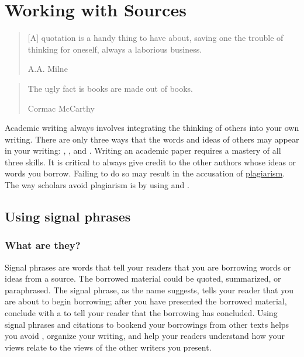 
\hypertarget{sources}{}


\chapter{Working with Sources}

\begin{quote} \small [A] quotation is a handy thing to have about, saving one the trouble of thinking for oneself, always a laborious business.

\textemdash A.A. Milne
\end{quote}

\begin{quote} \small The ugly fact is books are made out of books.

\textemdash Cormac McCarthy

\end{quote}

Academic writing always involves integrating the thinking of others into your own writing. There are only three ways that the words and ideas
of others may appear in your writing: \hyperlink{summary}{\color{Ahrenge}{summary}}, \hyperlink{paraphrase}{\color{Ahrenge}{paraphrase}}, and \hyperlink{quotation}{\color{Ahrenge}{quotation}}. Writing an academic paper requires a mastery of
all three skills. It is critical to always give credit to the other
authors whose ideas or words you borrow. Failing to do so may result in the
accusation of \hyperlink{plagiarism}{\color{Ahrenge}plagiarism}. The way scholars 
avoid plagiarism is by using  and \hyperlink{citation}{\color{Ahrenge}{citations}}.

\hypertarget{signalphrase}{}
\section{Using signal phrases}


\subsection{What are they?}

Signal phrases are words that tell your readers that you are borrowing words or ideas from a source. The borrowed material could be quoted, summarized, or paraphrased. The signal phrase, as the name suggests, tells your reader that you are about to begin borrowing; after you have presented the borrowed material, conclude with a \hyperlink{citation}{\color{Ahrenge}{citation}} to tell your reader that the borrowing has concluded. Using signal phrases and citations to bookend your borrowings from other texts helps you avoid \hyperlink{plagiarism}{\color{Ahrenge}{plagiarism}}, organize your writing, and help your readers understand how your views relate to the views of the other writers you present.

